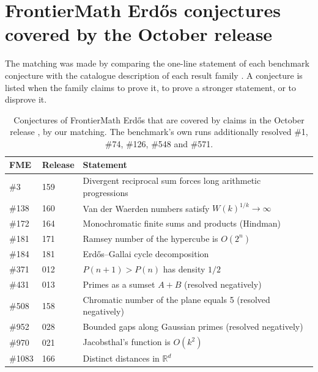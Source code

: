 \documentclass[11pt,a4paper]{article}
\theoremstyle{prob}
\begin{document}
\section{FrontierMath Erd\H{o}s conjectures covered by the October release}\label{app:fme}

The matching was made by comparing the one-line statement of each benchmark conjecture \cite{fme} with the catalogue description of each result family \cite{openairepo}. A conjecture is listed when the family claims to prove it, to prove a stronger statement, or to disprove it.

\begin{table}[!htb]
\centering\footnotesize
\begin{tabular}{llp{9.4cm}}
\toprule
FME & Release & Statement\\
\midrule
\#3 & 159 & Divergent reciprocal sum forces long arithmetic progressions\\
\#138 & 160 & Van der Waerden numbers satisfy $W(k)^{1/k}\to\infty$\\
\#172 & 164 & Monochromatic finite sums and products (Hindman)\\
\#181 & 171 & Ramsey number of the hypercube is $O(2^n)$\\
\#184 & 181 & Erd\H{o}s--Gallai cycle decomposition\\
\#371 & 012 & $P(n+1)>P(n)$ has density $1/2$\\
\#431 & 013 & Primes as a sumset $A+B$ (resolved negatively)\\
\#508 & 158 & Chromatic number of the plane equals 5 (resolved negatively)\\
\#952 & 028 & Bounded gaps along Gaussian primes (resolved negatively)\\
\#970 & 021 & Jacobsthal's function is $O(k^2)$\\
\#1083 & 166 & Distinct distances in $\mathbb{R}^d$\\
\bottomrule
\end{tabular}
\caption{Conjectures of FrontierMath Erd\H{o}s \cite{fme} that are covered by claims in the October release \cite{openairepo}, by our matching. The benchmark's own runs additionally resolved \#1, \#74, \#126, \#548 and \#571.}\label{tab:fme}
\end{table}
\end{document}
